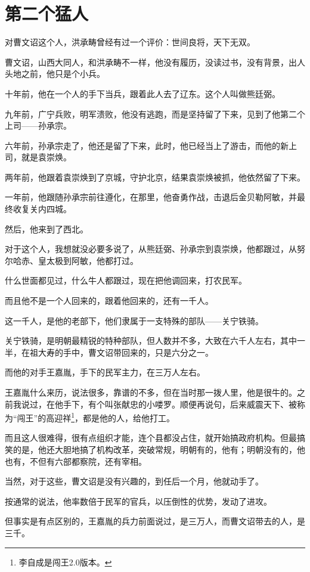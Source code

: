 \section{第二个猛人}
\ifnum{}
	\begin{multicols}{\theparacolNo}
\fi
对曹文诏这个人，洪承畴曾经有过一个评价：世间良将，天下无双。

曹文诏，山西大同人，和洪承畴不一样，他没有履历，没读过书，没有背景，出人头地之前，他只是个小兵。

十年前，他在一个人的手下当兵，跟着此人去了辽东。这个人叫做熊廷弼。

九年前，广宁兵败，明军溃败，他没有逃跑，而是坚持留了下来，见到了他第二个上司——孙承宗。

六年前，孙承宗走了，他还是留了下来，此时，他已经当上了游击，而他的新上司，就是袁崇焕。

两年前，他跟着袁崇焕到了京城，守护北京，结果袁崇焕被抓，他依然留了下来。

一年前，他跟随孙承宗前往遵化，在那里，他奋勇作战，击退后金贝勒阿敏，并最终收复关内四城。

然后，他来到了西北。

对于这个人，我想就没必要多说了，从熊廷弼、孙承宗到袁崇焕，他都跟过，从努尔哈赤、皇太极到阿敏，他都打过。

什么世面都见过，什么牛人都跟过，现在把他调回来，打农民军。

而且他不是一个人回来的，跟着他回来的，还有一千人。

这一千人，是他的老部下，他们隶属于一支特殊的部队——关宁铁骑。

关宁铁骑，是明朝最精锐的特种部队，但人数并不多，大致在六千人左右，其中一半，在祖大寿的手中，曹文诏带回来的，只是六分之一。

而他的对手王嘉胤，手下的民军主力，在三万人左右。

王嘉胤什么来历，说法很多，靠谱的不多，但在当时那一拨人里，他是很牛的。之前我说过，在他手下，有个叫张献忠的小喽罗。顺便再说句，后来威震天下、被称为“闯王”的高迎祥\footnote{李自成是闯王2.0版本。}，都是他的人，给他打工。

而且这人很难得，很有点组织才能，连个县都没占住，就开始搞政府机构。但最搞笑的是，他还大胆地搞了机构改革，突破常规，明朝有的，他有；明朝没有的，他也有，不但有六部都察院，还有宰相。

当然，对于这些，曹文诏是没有兴趣的，到任后一个月，他就动手了。

按通常的说法，他率数倍于民军的官兵，以压倒性的优势，发动了进攻。

但事实是有点区别的，王嘉胤的兵力前面说过，是三万人，而曹文诏带去的人，是三千。


\end{multicols}
